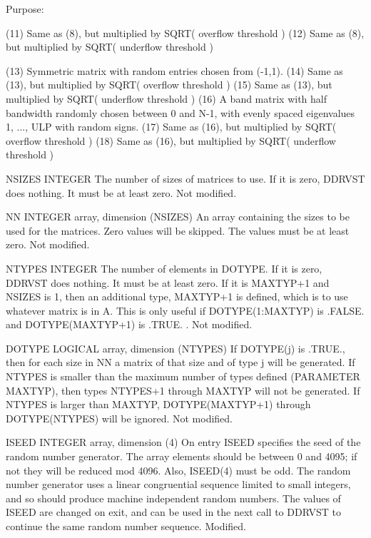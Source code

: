 \begin{DoxyParagraph}{Purpose\+: }
\begin{DoxyVerb}
      (11) Same as (8), but multiplied by SQRT( overflow threshold )
      (12) Same as (8), but multiplied by SQRT( underflow threshold )

      (13) Symmetric matrix with random entries chosen from (-1,1).
      (14) Same as (13), but multiplied by SQRT( overflow threshold )
      (15) Same as (13), but multiplied by SQRT( underflow threshold )
      (16) A band matrix with half bandwidth randomly chosen between
           0 and N-1, with evenly spaced eigenvalues 1, ..., ULP
           with random signs.
      (17) Same as (16), but multiplied by SQRT( overflow threshold )
      (18) Same as (16), but multiplied by SQRT( underflow threshold )\end{DoxyVerb}
 \begin{DoxyVerb}  NSIZES  INTEGER
          The number of sizes of matrices to use.  If it is zero,
          DDRVST does nothing.  It must be at least zero.
          Not modified.

  NN      INTEGER array, dimension (NSIZES)
          An array containing the sizes to be used for the matrices.
          Zero values will be skipped.  The values must be at least
          zero.
          Not modified.

  NTYPES  INTEGER
          The number of elements in DOTYPE.   If it is zero, DDRVST
          does nothing.  It must be at least zero.  If it is MAXTYP+1
          and NSIZES is 1, then an additional type, MAXTYP+1 is
          defined, which is to use whatever matrix is in A.  This
          is only useful if DOTYPE(1:MAXTYP) is .FALSE. and
          DOTYPE(MAXTYP+1) is .TRUE. .
          Not modified.

  DOTYPE  LOGICAL array, dimension (NTYPES)
          If DOTYPE(j) is .TRUE., then for each size in NN a
          matrix of that size and of type j will be generated.
          If NTYPES is smaller than the maximum number of types
          defined (PARAMETER MAXTYP), then types NTYPES+1 through
          MAXTYP will not be generated.  If NTYPES is larger
          than MAXTYP, DOTYPE(MAXTYP+1) through DOTYPE(NTYPES)
          will be ignored.
          Not modified.

  ISEED   INTEGER array, dimension (4)
          On entry ISEED specifies the seed of the random number
          generator. The array elements should be between 0 and 4095;
          if not they will be reduced mod 4096.  Also, ISEED(4) must
          be odd.  The random number generator uses a linear
          congruential sequence limited to small integers, and so
          should produce machine independent random numbers. The
          values of ISEED are changed on exit, and can be used in the
          next call to DDRVST to continue the same random number
          sequence.
          Modified.


\end{DoxyVerb}
\end{DoxyParagraph}
